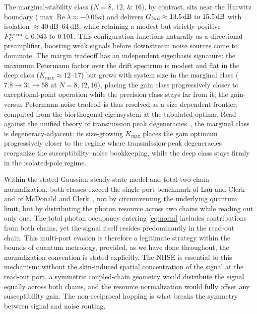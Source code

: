 \documentclass[aps,prxquantum,preprint,superscriptaddress,amsmath,amssymb]{revtex4-2}
\newcommand{\Real}{\operatorname{Re}}
\newcommand{\Fnorm}{F_C^{\rm norm}}
\newcommand{\Gfwd}{G_{\rm fwd}}
\begin{document}
The marginal-stability class ($N=\numlist{8;12;16}$), by contrast, sits near the Hurwitz boundary ($\max\Real\lambda\approx\num{-0.06}\kappa$) and delivers $\Gfwd\approx\qtyrange{13.5}{15.5}{\dB}$ with isolation $\approx\qtyrange{40}{64}{\dB}$, while retaining a modest but strictly positive $\Fnorm\in\numrange{0.043}{0.101}$. This configuration functions naturally as a directional preamplifier, boosting weak signals before downstream noise sources come to dominate. The margin tradeoff has an independent eigenbasis signature: the maximum Petermann factor over the drift spectrum is modest and flat in the deep class ($K_{\max}\approx\num{12}$--$\num{17}$) but grows with system size in the marginal class ($\num{7.8}\to\num{31}\to\num{58}$ at $N=\num{8},\num{12},\num{16}$), placing the gain class progressively closer to exceptional-point operation while the precision class stays far from it; the gain-versus-Petermann-noise tradeoff is thus resolved as a size-dependent frontier, computed from the biorthogonal eigensystem at the tabulated optima. Read against the unified theory of transmission peak degeneracies~\citep{Carney2026}, the marginal class is degeneracy-adjacent: its size-growing $K_{\max}$ places the gain optimum progressively closer to the regime where transmission-peak degeneracies reorganize the susceptibility--noise bookkeeping, while the deep class stays firmly in the isolated-pole regime.

Within the stated Gaussian steady-state model and total two-chain normalization, both classes exceed the single-port benchmark of Lau and Clerk~\citep{Lau2018} and of McDonald and Clerk~\citep{McDonald2020}, not by circumventing the underlying quantum limit, but by distributing the photon resource across two chains while reading out only one. The total photon occupancy entering \cref{eq:norm} includes contributions from both chains, yet the signal itself resides predominantly in the read-out chain. This multi-port evasion is therefore a legitimate strategy within the bounds of quantum metrology, provided, as we have done throughout, the normalization convention is stated explicitly. The NHSE is essential to this mechanism: without the skin-induced spatial concentration of the signal at the read-out port, a symmetric coupled-chain geometry would distribute the signal equally across both chains, and the resource normalization would fully offset any susceptibility gain. The non-reciprocal hopping is what breaks the symmetry between signal and noise routing.
\end{document}
